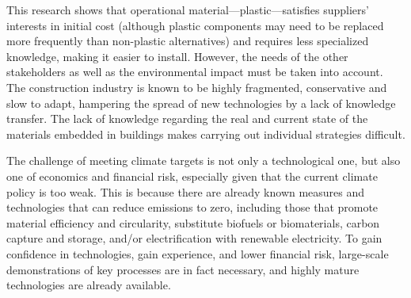 This research shows that operational material—plastic—satisfies suppliers' interests in initial cost (although plastic components may need to be replaced more frequently than non-plastic alternatives) and requires less specialized knowledge, making it easier to install. However, the needs of the other stakeholders as well as the environmental impact must be taken into account. The construction industry is known to be highly fragmented, conservative and slow to adapt, hampering the spread of new technologies by a lack of knowledge transfer. The lack of knowledge regarding the real and current state of the materials embedded in buildings makes carrying out individual strategies difficult. 

The challenge of meeting climate targets is not only a technological one, but also one of economics and financial risk, especially given that the current climate policy is too weak. This is because there are already known measures and technologies that can reduce emissions to zero, including those that promote material efficiency and circularity, substitute biofuels or biomaterials, carbon capture and storage, and/or electrification with renewable electricity. To gain confidence in technologies, gain experience, and lower financial risk, large-scale demonstrations of key processes are in fact necessary, and highly mature technologies are already available. \autocite{karlsson2020roadmap}


